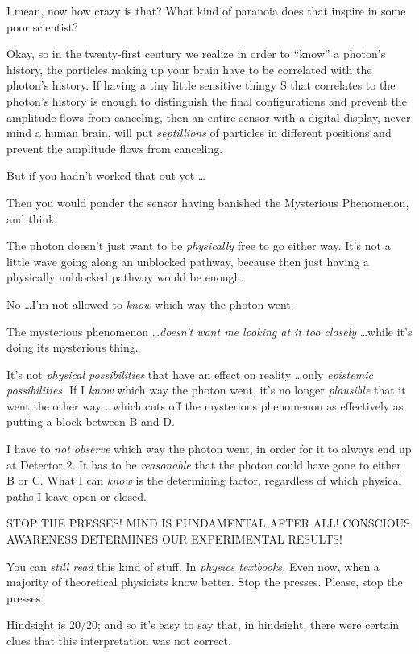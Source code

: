 {
 I mean, now how crazy is that? What kind of paranoia does that
inspire in some poor scientist?}

{
 Okay, so in the twenty-first century we realize in order to
``know'' a photon's
history, the particles making up your brain have to be correlated with
the photon's history. If having a tiny little sensitive
thingy S that correlates to the photon's history is
enough to distinguish the final configurations and prevent the
amplitude flows from canceling, then an entire sensor with a digital
display, never mind a human brain, will put \textit{septillions} of
particles in different positions and prevent the amplitude flows from
canceling.}

{
 But if you hadn't worked that out yet \ldots}

{
 Then you would ponder the sensor having banished the Mysterious
Phenomenon, and think:}

{
 The photon doesn't just want to be
\textit{physically} free to go either way. It's not a
little wave going along an unblocked pathway, because then just having
a physically unblocked pathway would be enough.}

{
 No \ldots I'm not allowed to \textit{know} which
way the photon went.}

{
 The mysterious phenomenon \ldots \textit{doesn't
want me looking at it too closely} \ldots while it's
doing its mysterious thing.}

{
 It's not \textit{physical possibilities} that have
an effect on reality \ldots only \textit{epistemic possibilities.} If I
\textit{know} which way the photon went, it's no longer
\textit{plausible} that it went the other way \ldots which cuts off the
mysterious phenomenon as effectively as putting a block between B and
D.}

{
 I have to \textit{not observe} which way the photon went, in order
for it to always end up at Detector 2. It has to be \textit{reasonable}
that the photon could have gone to either B or C. What I can
\textit{know} is the determining factor, regardless of which physical
paths I leave open or closed.}

{
 STOP THE PRESSES! MIND IS FUNDAMENTAL AFTER ALL! CONSCIOUS
AWARENESS DETERMINES OUR EXPERIMENTAL RESULTS!}

{
 You can \textit{still read} this kind of stuff. In \textit{physics
textbooks.} Even now, when a majority of theoretical physicists know
better. Stop the presses. Please, stop the presses.}

{
 Hindsight is 20/20; and so it's easy to say that,
in hindsight, there were certain clues that this interpretation was not
correct.}

